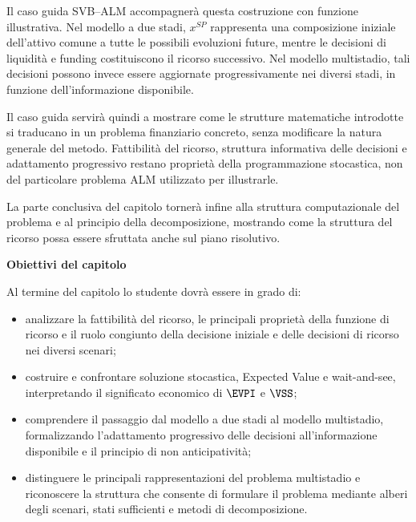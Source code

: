Il caso guida SVB--ALM accompagner\`a questa costruzione con funzione
illustrativa. Nel modello a due stadi, $x^{SP}$ rappresenta una composizione
iniziale dell'attivo comune a tutte le possibili evoluzioni future, mentre
le decisioni di liquidit\`a e funding costituiscono il ricorso successivo.
Nel modello multistadio, tali decisioni possono invece essere aggiornate
progressivamente nei diversi stadi, in funzione dell'informazione disponibile.

Il caso guida servir\`a quindi a mostrare come le strutture matematiche
introdotte si traducano in un problema finanziario concreto, senza modificare
la natura generale del metodo. Fattibilit\`a del ricorso, struttura
informativa delle decisioni e adattamento progressivo restano propriet\`a
della programmazione stocastica, non del particolare problema ALM utilizzato
per illustrarle.

La parte conclusiva del capitolo torner\`a infine alla struttura
computazionale del problema e al principio della decomposizione, mostrando
come la struttura del ricorso possa essere sfruttata anche sul piano
risolutivo.

\medskip

\noindent
\textbf{Obiettivi del capitolo}

Al termine del capitolo lo studente dovr\`a essere in grado di:

\begin{itemize}

\item analizzare la fattibilit\`a del ricorso, le principali propriet\`a
della funzione di ricorso e il ruolo congiunto della decisione iniziale e
delle decisioni di ricorso nei diversi scenari;

\item costruire e confrontare soluzione stocastica, Expected Value e
wait-and-see, interpretando il significato economico di $\EVPI$ e $\VSS$;

\item comprendere il passaggio dal modello a due stadi al modello multistadio,
formalizzando l'adattamento progressivo delle decisioni all'informazione
disponibile e il principio di non anticipativit\`a;

\item distinguere le principali rappresentazioni del problema multistadio e
riconoscere la struttura che consente di formulare il problema mediante alberi
degli scenari, stati sufficienti e metodi di decomposizione.

\end{itemize}

